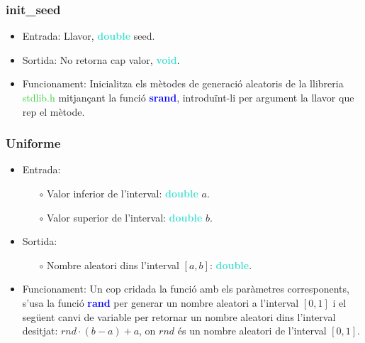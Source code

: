 \documentclass[a4paper, 11pt]{article}
\begin{document}
\subsubsection{init\_seed}
\begin{itemize}
    \item Entrada: Llavor, \textbf{\textcolor{Turquoise}{double}} seed.
    \item Sortida: No retorna cap valor, \textbf{\textcolor{Turquoise}{void}}.
    \item Funcionament:
    Inicialitza els mètodes de generació aleatoris de la llibreria \textcolor{LimeGreen}{stdlib.h} mitjançant la funció \textbf{\textcolor{blue}{srand}}, introduïnt-li per argument la llavor que rep el mètode.
\end{itemize}


\subsubsection{Uniforme}
\begin{itemize}
    \item Entrada:
    \begin{itemize}
        \item[$\circ$] Valor inferior de l'interval: \textbf{\textcolor{Turquoise}{double}} $a$.
        \item[$\circ$] Valor superior de l'interval: \textbf{\textcolor{Turquoise}{double}} $b$.
    \end{itemize}
    \item Sortida:
        \begin{itemize}
            \item[$\circ$] Nombre aleatori dins l'interval $[a,b]$:  \textbf{\textcolor{Turquoise}{double}}.
        \end{itemize}
    \item Funcionament:
    Un cop cridada la funció amb els paràmetres corresponents, s'usa la funció \textbf{\textcolor{blue}{rand}} per generar un nombre aleatori a l'interval $[0,1]$ i el següent canvi de variable per retornar un nombre aleatori dins l'interval desitjat: $rnd \cdot (b-a) + a $, on $rnd$ és un nombre aleatori de l'interval $[0,1]$.
    
\end{itemize}
\newpage
\end{document}
